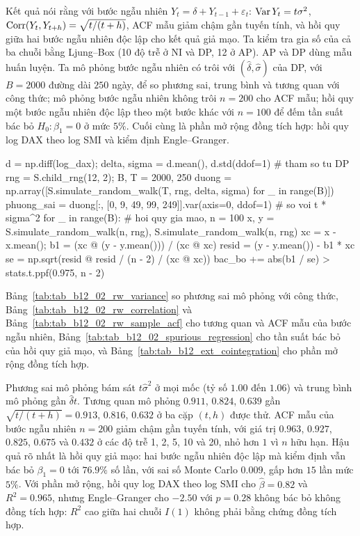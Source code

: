  Kết quả  nói rằng với bước ngẫu nhiên $Y_t=\delta+Y_{t-1}+\varepsilon_t$: $\operatorname{Var} Y_t=t\sigma^2$, $\operatorname{Corr}(Y_t,Y_{t+h})=\sqrt{t/(t+h)}$, ACF mẫu giảm chậm gần tuyến tính, và hồi quy giữa hai bước ngẫu nhiên độc lập cho kết quả giả mạo.
 Ta kiểm tra gia số của cả ba chuỗi bằng Ljung--Box (10 độ trễ ở NI và DP, 12 ở AP). AP và DP dùng mẫu huấn luyện. Ta mô phỏng bước ngẫu nhiên có trôi với $(\hat\delta,\hat\sigma)$ của DP, với $B=2000$ đường dài $250$ ngày, để so phương sai, trung bình và tương quan với công thức; mô phỏng bước ngẫu nhiên không trôi $n=200$ cho ACF mẫu; hồi quy một bước ngẫu nhiên độc lập theo một bước khác với $n=100$ để đếm tần suất bác bỏ $H_0:\beta_1=0$ ở mức $5\%$. Cuối cùng là phần mở rộng đồng tích hợp: hồi quy log DAX theo log SMI và kiểm định Engle--Granger.
\begin{codeblock}
d = np.diff(log_dax); delta, sigma = d.mean(), d.std(ddof=1)      # tham so tu DP
rng = S.child_rng(12, 2); B, T = 2000, 250
duong = np.array([S.simulate_random_walk(T, rng, delta, sigma) for _ in range(B)])
phuong_sai = duong[:, [0, 9, 49, 99, 249]].var(axis=0, ddof=1)    # so voi t * sigma^2
for _ in range(B):                                    # hoi quy gia mao, n = 100
    x, y = S.simulate_random_walk(n, rng), S.simulate_random_walk(n, rng)
    xc = x - x.mean(); b1 = (xc @ (y - y.mean())) / (xc @ xc)
    resid = (y - y.mean()) - b1 * xc
    se = np.sqrt(resid @ resid / (n - 2) / (xc @ xc))
    bac_bo += abs(b1 / se) > stats.t.ppf(0.975, n - 2)
\end{codeblock}
 Bảng~\ref{tab:tab_b12_02_rw_variance} so phương sai mô phỏng với công thức, Bảng~\ref{tab:tab_b12_02_rw_correlation} và Bảng~\ref{tab:tab_b12_02_rw_sample_acf} cho tương quan và ACF mẫu của bước ngẫu nhiên, Bảng~\ref{tab:tab_b12_02_spurious_regression} cho tần suất bác bỏ của hồi quy giả mạo, và Bảng~\ref{tab:tab_b12_ext_cointegration} cho phần mở rộng đồng tích hợp.





 Phương sai mô phỏng bám sát $t\hat\sigma^2$ ở mọi mốc (tỷ số $1.00$ đến $1.06$) và trung bình mô phỏng gần $\hat\delta t$. Tương quan mô phỏng $0.911$, $0.824$, $0.639$ gần $\sqrt{t/(t+h)}=0.913$, $0.816$, $0.632$ ở ba cặp $(t,h)$ được thử. ACF mẫu của bước ngẫu nhiên $n=200$ giảm chậm gần tuyến tính, với giá trị $0.963$, $0.927$, $0.825$, $0.675$ và $0.432$ ở các độ trễ 1, 2, 5, 10 và 20, nhỏ hơn $1$ vì $n$ hữu hạn. Hậu quả rõ nhất là hồi quy giả mạo: hai bước ngẫu nhiên độc lập mà kiểm định vẫn bác bỏ $\beta_1=0$ tới $76.9\%$ số lần, với sai số Monte Carlo $0.009$, gấp hơn $15$ lần mức $5\%$. Với phần mở rộng, hồi quy log DAX theo log SMI cho $\hat\beta=0.82$ và $R^2=0.965$, nhưng Engle--Granger cho $-2.50$ với $p=0.28$ không bác bỏ không đồng tích hợp: $R^2$ cao giữa hai chuỗi $I(1)$ không phải bằng chứng đồng tích hợp.

